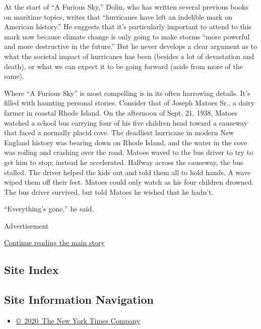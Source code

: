 At the start of ``A Furious Sky,'' Dolin, who has written several
previous books on maritime topics, writes that ``hurricanes have left an
indelible mark on American history.'' He suggests that it's particularly
important to attend to this mark now because climate change is only
going to make storms ``more powerful and more destructive in the
future.'' But he never develops a clear argument as to what the societal
impact of hurricanes has been (besides a lot of devastation and death),
or what we can expect it to be going forward (aside from more of the
same).

Where ``A Furious Sky'' is most compelling is in its often harrowing
details. It's filled with haunting personal stories. Consider that of
Joseph Matoes Sr., a dairy farmer in coastal Rhode Island. On the
afternoon of Sept. 21, 1938, Matoes watched a school bus carrying four
of his five children head toward a causeway that faced a normally placid
cove. The deadliest hurricane in modern New England history was bearing
down on Rhode Island, and the water in the cove was roiling and crashing
over the road. Matoes waved to the bus driver to try to get him to stop;
instead he accelerated. Halfway across the causeway, the bus stalled.
The driver helped the kids out and told them all to hold hands. A wave
wiped them off their feet. Matoes could only watch as his four children
drowned. The bus driver survived, but told Matoes he wished that he
hadn't.

``Everything's gone,'' he said.

Advertisement

\protect\hyperlink{after-bottom}{Continue reading the main story}

\hypertarget{site-index}{%
\subsection{Site Index}\label{site-index}}

\hypertarget{site-information-navigation}{%
\subsection{Site Information
Navigation}\label{site-information-navigation}}

\begin{itemize}
\tightlist
\item
  \href{https://help.nytimes.com/hc/en-us/articles/115014792127-Copyright-notice}{©~2020~The
  New York Times Company}
\end{itemize}

